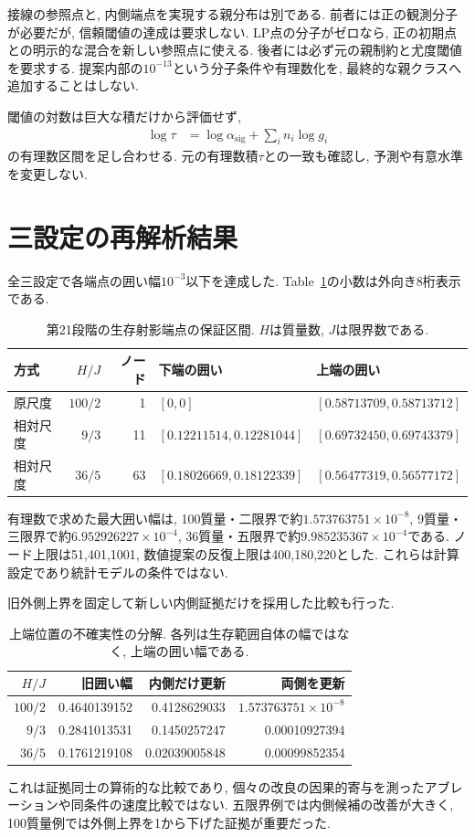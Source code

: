 接線の参照点と, 内側端点を実現する親分布は別である.
前者には正の観測分子が必要だが, 信頼閾値の達成は要求しない.
LP点の分子がゼロなら, 正の初期点との明示的な混合を新しい参照点に使える.
後者には必ず元の親制約と尤度閾値を要求する.
提案内部の$10^{-13}$という分子条件や有理数化を,
最終的な親クラスへ追加することはしない.

閾値の対数は巨大な積だけから評価せず,
\begin{align}
\log\tau&=\log\alpha_{\mathrm{sig}}+\sum_i n_i\log g_i
\label{eq:stage21_factorized_threshold}
\end{align}
の有理数区間を足し合わせる.
元の有理数積$\tau$との一致も確認し, 予測や有意水準を変更しない.

\section{三設定の再解析結果}
\label{sec:stage21_results}

全三設定で各端点の囲い幅$10^{-3}$以下を達成した.
Table~\ref{tab:stage21_endpoints}の小数は外向き8桁表示である.
\begin{table}[htbp]
\centering
\caption{第21段階の生存射影端点の保証区間.
$H$は質量数, $J$は限界数である.}
\label{tab:stage21_endpoints}
\footnotesize
\setlength{\tabcolsep}{3pt}
\begin{tabular}{lrrll}
\toprule
方式 & $H/J$ & ノード & 下端の囲い & 上端の囲い \\
\midrule
原尺度 & $100/2$ & 1 & $[0,0]$ & $[0.58713709,0.58713712]$ \\
相対尺度 & $9/3$ & 11 & $[0.12211514,0.12281044]$ & $[0.69732450,0.69743379]$ \\
相対尺度 & $36/5$ & 63 & $[0.18026669,0.18122339]$ & $[0.56477319,0.56577172]$ \\
\bottomrule
\end{tabular}
\end{table}
有理数で求めた最大囲い幅は, 100質量・二限界で約$1.573763751\times10^{-8}$,
9質量・三限界で約$6.952926227\times10^{-4}$,
36質量・五限界で約$9.985235367\times10^{-4}$である.
ノード上限は51,401,1001,
数値提案の反復上限は400,180,220とした.
これらは計算設定であり統計モデルの条件ではない.

旧外側上界を固定して新しい内側証拠だけを採用した比較も行った.
\begin{table}[htbp]
\centering
\caption{上端位置の不確実性の分解.
各列は生存範囲自体の幅ではなく, 上端の囲い幅である.}
\label{tab:stage21_inner_outer}
\begin{tabular}{rrrr}
\toprule
$H/J$ & 旧囲い幅 & 内側だけ更新 & 両側を更新 \\
\midrule
$100/2$ & 0.4640139152 & 0.4128629033 & $1.573763751\times10^{-8}$ \\
$9/3$ & 0.2841013531 & 0.1450257247 & 0.00010927394 \\
$36/5$ & 0.1761219108 & 0.02039005848 & 0.00099852354 \\
\bottomrule
\end{tabular}
\end{table}
これは証拠同士の算術的な比較であり,
個々の改良の因果的寄与を測ったアブレーションや同条件の速度比較ではない.
五限界例では内側候補の改善が大きく,
100質量例では外側上界を1から下げた証拠が重要だった.

